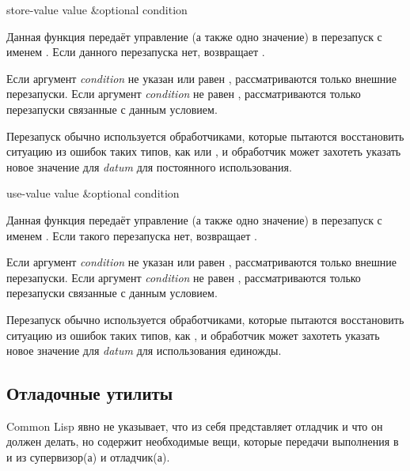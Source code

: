 \begin{defun}[Функция]
store-value value &optional condition

Данная функция передаёт управление (а также одно значение) в перезапуск с
именем . Если данного перезапуска нет, 
возвращает .

Если аргумент \emph{condition} не указан или равен , рассматриваются
только внешние перезапуски. Если аргумент \emph{condition} не равен ,
рассматриваются только перезапуски связанные с данным условием.

Перезапуск  обычно используется обработчиками, которые пытаются
восстановить ситуацию из ошибок таких типов, как  или
, и обработчик может захотеть указать новое значение для
\emph{datum} для постоянного использования.
\end{defun}

\begin{defun}[Функция]
use-value value &optional condition

Данная функция передаёт управление (а также одно значение) в перезапуск с
именем . Если такого перезапуска нет,  возвращает
.

Если аргумент \emph{condition} не указан или равен , рассматриваются
только внешние перезапуски. Если аргумент \emph{condition} не равен ,
рассматриваются только перезапуски связанные с данным условием.

Перезапуск  обычно используется обработчиками, которые пытаются
восстановить ситуацию из ошибок таких типов, как , и обработчик
может захотеть указать новое значение для \emph{datum} для использования
единожды.
\end{defun}

\subsection{Отладочные утилиты}
\label{DEBUGGING-UTILITIES}

Common Lisp явно не указывает, что из себя представляет отладчик и что он должен
делать, но содержит необходимые вещи, которые передачи выполнения в и из
супервизор(а) и отладчик(а).

